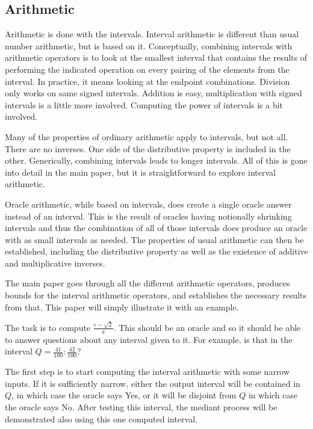 \documentclass[12pt]{article}
\theoremstyle{remark}
\begin{document}
\subsection{Arithmetic}

Arithmetic is done with the intervals. Interval arithmetic is different than usual number arithmetic, but is based on it. Conceptually, combining intervals with arithmetic operators is to look at the smallest interval that contains the results of performing the indicated operation on every pairing of the elements from the interval. In practice, it means looking at the endpoint combinations. Division only works on same signed intervals. Addition is easy, multiplication with signed intervals is a little more involved. Computing the power of intervals is a bit involved. 


Many of the properties of ordinary arithmetic apply to intervals, but not all. There are no inverses. One side of the distributive property is included in the other. Generically, combining intervals leads to longer intervals. All of this is gone into detail in the main paper, but it is straightforward to explore interval arithmetic. 

Oracle arithmetic, while based on intervals, does create a single oracle answer instead of an interval. This is the result of oracles having notionally shrinking intervals and thus the combination of all of those intervals does produce an oracle with as small intervals as needed. The properties of usual arithmetic can then be established, including the distributive property as well as the existence of additive and multiplicative inverses.   

The main paper goes through all the different arithmetic operators, produces bounds for the interval arithmetic operators, and establishes the necessary results from that. This paper will simply illustrate it with an example. 

The task is to compute $\frac{e-\sqrt{2}}{\pi}$. This should be an oracle and so it should be able to answer questions about any interval given to it. For example, is that in the interval $Q = \frac{41}{100}: \frac{42}{100}$? 

The first step is to start computing the interval arithmetic with some narrow inputs. If it is sufficiently narrow, either the output interval will be contained in $Q$, in which case the oracle says Yes, or it will be disjoint from $Q$ in which case the oracle says No. After testing this interval, the mediant process will be demonstrated also using this one computed interval. 
\end{document}
